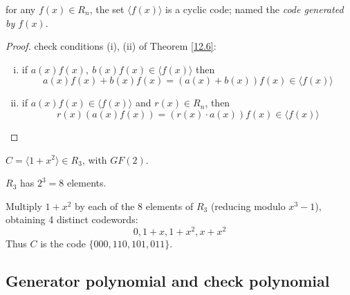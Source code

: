 \documentclass{article}
\theoremstyle{definition}
\newenvironment{thm}[1]
{\renewcommand\theinnerthm{#1}\innerthm}
{\endinnerthm}
\newenvironment{eg}[1]
{\renewcommand\theinnereg{#1}\innereg}
{\endinnereg}
\begin{document}
\begin{thm}{12.7}
  for any $f(x) \in R_n$, the set $\langle f(x) \rangle$ is a cyclic code; named the \emph{code generated by $f(x)$}.
\end{thm}
\begin{proof}
  check conditions (i), (ii) of Theorem \ref{12.6}:
  \begin{enumerate}[i.]
    \item if $a(x)f(x),~ b(x)f(x) \in \langle f(x) \rangle$ then
      $$a(x)f(x)+b(x)f(x)= (a(x)+ b(x)) f(x) \in \langle f(x) \rangle$$

    \item if $a(x)f(x) \in \langle f(x) \rangle$ and $r(x) \in R_n$, then
      $$r(x) (a(x)f(x))= (r(x) \cdot a(x)) f(x) \in \langle f(x) \rangle$$
  \end{enumerate}
\end{proof}

\begin{eg}{12.8}
  $C=\langle 1+x^2 \rangle \in R_3$, with $GF(2)$.

  $R_3$ has $2^3=8$ elements.

  Multiply $1+x^2$ by each of the 8 elements of $R_3$ (reducing modulo $x^3-1$), obtaining 4 distinct codewords:
  $$0, 1+x, 1+x^2, x+x^2$$
  Thus $C$ is the code $\{ 000, 110, 101, 011 \}$.
\end{eg}


\subsection{Generator polynomial and check polynomial}
\end{document}
